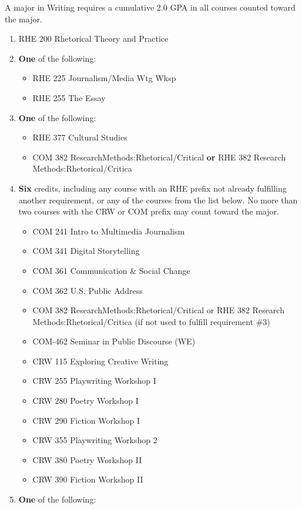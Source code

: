 \documentclass[
  letterpaper,
]{scrbook}
\providecommand{\tightlist}{%
  \setlength{\itemsep}{0pt}\setlength{\parskip}{0pt}}
\begin{document}
A major in Writing requires a cumulative 2.0 GPA in all courses counted
toward the major.

\begin{enumerate}
\def\labelenumi{\arabic{enumi}.}
\item
  RHE 200 Rhetorical Theory and Practice
\item
  \textbf{One} of the following:

  \begin{itemize}
  \tightlist
  \item
    RHE 225 Journalism/Media Wtg Wksp
  \item
    RHE 255 The Essay
  \end{itemize}
\item
  \textbf{One} of the following:

  \begin{itemize}
  \tightlist
  \item
    RHE 377 Cultural Studies
  \item
    COM 382 ResearchMethods:Rhetorical/Critical \textbf{or} RHE 382
    Research Methods:Rhetorical/Critica
  \end{itemize}
\item
  \textbf{Six} credits, including any course with an RHE prefix not
  already fulfilling another requirement, or any of the courses from the
  list below. No more than two courses with the CRW or COM prefix may
  count toward the major.

  \begin{itemize}
  \tightlist
  \item
    COM 241 Intro to Multimedia Journalism
  \item
    COM 341 Digital Storytelling
  \item
    COM 361 Communication \& Social Change
  \item
    COM 362 U.S. Public Address
  \item
    COM 382 ResearchMethods:Rhetorical/Critical or RHE 382 Research
    Methods:Rhetorical/Critica (if not used to fulfill requirement \#3)
  \item
    COM-462 Seminar in Public Discourse (WE)
  \item
    CRW 115 Exploring Creative Writing
  \item
    CRW 255 Playwriting Workshop I
  \item
    CRW 280 Poetry Workshop I
  \item
    CRW 290 Fiction Workshop I
  \item
    CRW 355 Playwriting Workshop 2
  \item
    CRW 380 Poetry Workshop II
  \item
    CRW 390 Fiction Workshop II
  \end{itemize}
\item
  \textbf{One} of the following:


\end{enumerate}
\end{document}
